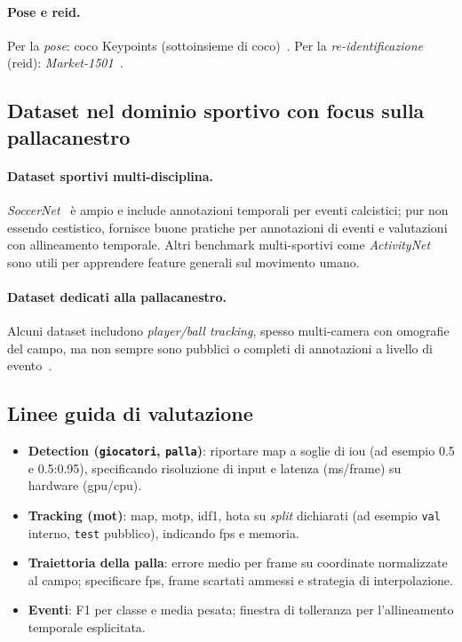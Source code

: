 \documentclass[12pt,a4paper,openright,twoside]{book}
\begin{document}
\paragraph{Pose e \ac{reid}.} Per la \emph{pose}: 
\ac{coco} Keypoints (sottoinsieme di \ac{coco})~\cite{Lin2014Microsoft}.
Per la \emph{re-identificazione} (\ac{reid}): \emph{Market-1501}~\cite{Zheng2015Scalable}.

\subsection{Dataset nel dominio sportivo con focus sulla pallacanestro}

\paragraph{Dataset sportivi multi-disciplina.} \emph{SoccerNet}~\cite{Giancola2018Soccernet} 
è ampio e include annotazioni temporali per eventi calcistici; 
pur non essendo cestistico, fornisce buone pratiche per annotazioni 
di eventi e valutazioni con allineamento temporale. Altri benchmark
multi-sportivi come \emph{ActivityNet}~\cite{CabaHeilbron2015ActivityNet}
sono utili per apprendere feature generali sul movimento umano.

\paragraph{Dataset dedicati alla pallacanestro.} Alcuni dataset includono 
\emph{player/ball tracking}, spesso multi-camera con 
omografie del campo, ma non sempre sono pubblici o 
completi di annotazioni a livello di 
evento~\cite{dOrey2020APIDIS, Karun2022DeepSport, Pan2023BasketballInstants}.

\subsection{Linee guida di valutazione}

\begin{itemize}
  \item \textbf{Detection (\texttt{giocatori}, \texttt{palla})}: 
  riportare \ac{map} a soglie di \ac{iou} (ad esempio 0.5 e 0.5:0.95), 
  specificando risoluzione di input e latenza (ms/frame) su hardware 
  (\ac{gpu}/\ac{cpu}).
  \item \textbf{Tracking (\ac{mot})}: \ac{map}, \ac{motp}, 
  \ac{idf1}, \ac{hota} su \emph{split} dichiarati (ad esempio 
  \texttt{val} interno, \texttt{test} pubblico), indicando 
  \ac{fps} e memoria.
  \item \textbf{Traiettoria della palla}: errore medio per frame su 
  coordinate normalizzate al campo; specificare \ac{fps},
  frame scartati ammessi e strategia di interpolazione.
  \item \textbf{Eventi}: F1 per classe e media pesata; 
  finestra di tolleranza per l'allineamento temporale esplicitata.
\end{itemize}
\end{document}
